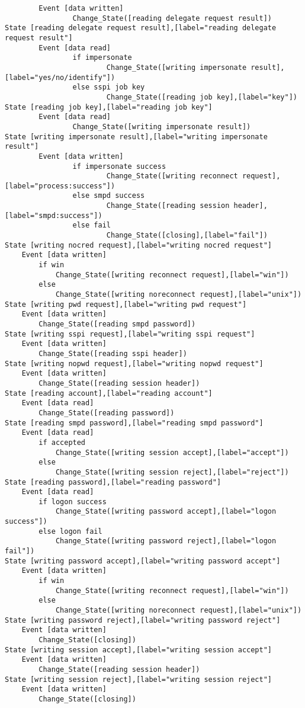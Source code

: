 \begin{verbatim}
        Event [data written]
                Change_State([reading delegate request result])
State [reading delegate request result],[label="reading delegate request result"]
        Event [data read]
                if impersonate
                        Change_State([writing impersonate result],[label="yes/no/identify"])
                else sspi job key
						Change_State([reading job key],[label="key"])
State [reading job key],[label="reading job key"]
		Event [data read]
				Change_State([writing impersonate result])
State [writing impersonate result],[label="writing impersonate result"]
        Event [data written]
				if impersonate success
						Change_State([writing reconnect request],[label="process:success"])
				else smpd success
						Change_State([reading session header],[label="smpd:success"])
				else fail
						Change_State([closing],[label="fail"])
State [writing nocred request],[label="writing nocred request"]
	Event [data written]
		if win
			Change_State([writing reconnect request],[label="win"])
		else
			Change_State([writing noreconnect request],[label="unix"])
State [writing pwd request],[label="writing pwd request"]
	Event [data written]
		Change_State([reading smpd password])
State [writing sspi request],[label="writing sspi request"]
	Event [data written]
		Change_State([reading sspi header])
State [writing nopwd request],[label="writing nopwd request"]
	Event [data written]
		Change_State([reading session header])
State [reading account],[label="reading account"]
	Event [data read]
		Change_State([reading password])
State [reading smpd password],[label="reading smpd password"]
	Event [data read]
		if accepted
			Change_State([writing session accept],[label="accept"])
		else
			Change_State([writing session reject],[label="reject"])
State [reading password],[label="reading password"]
	Event [data read]
		if logon success
			Change_State([writing password accept],[label="logon success"])
		else logon fail
			Change_State([writing password reject],[label="logon fail"])
State [writing password accept],[label="writing password accept"]
	Event [data written]
		if win
			Change_State([writing reconnect request],[label="win"])
		else
			Change_State([writing noreconnect request],[label="unix"])
State [writing password reject],[label="writing password reject"]
	Event [data written]
		Change_State([closing])
State [writing session accept],[label="writing session accept"]
	Event [data written]
		Change_State([reading session header])
State [writing session reject],[label="writing session reject"]
	Event [data written]
		Change_State([closing])

\end{verbatim}
